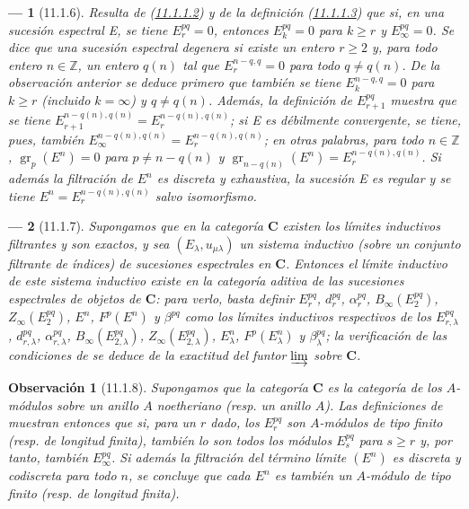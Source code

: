 \documentclass[10pt,oneside,openany]{book}
\theoremstyle{egaenv}\newtheorem*{env}{---}
\theoremstyle{egastatement}
\theoremstyle{egadescription}
\newtheorem*{remark}{Observación}
\renewcommand{\geq}{\geqslant}
\begin{document}
\begin{env}[11.1.6]
\label{0.11.1.6-fr}
Resulta de (\hyperref[0.11.1.1.2-fr]{11.1.1.2}) y de la definición (\hyperref[0.11.1.1.3-fr]{11.1.1.3}) que si, en una sucesión espectral E, se tiene
$E_r^{pq}=0$, entonces $E_k^{pq}=0$ para $k\geq r$ y $E_\infty^{pq}=0$.
Se dice que una sucesión espectral \emph{degenera} si existe un entero $r\geq2$ y, para todo entero $n\in\mathbb Z$, un entero $q(n)$ tal que \emph{$E_r^{n-q,q}=0$ para todo $q\ne q(n)$}.
De la observación anterior se deduce primero que también se tiene $E_k^{n-q,q}=0$ para $k\geq r$ (incluido $k=\infty$) y $q\ne q(n)$.
Además, la definición de $E_{r+1}^{pq}$ muestra que se tiene $E_{r+1}^{n-q(n),q(n)}=E_r^{n-q(n),q(n)}$; si E es \emph{débilmente convergente}, se tiene, pues, también
$E_\infty^{n-q(n),q(n)}=E_r^{n-q(n),q(n)}$; en otras palabras, para todo $n\in\mathbb Z$, $\operatorname{gr}_p(E^n)=0$ para $p\ne n-q(n)$ y $\operatorname{gr}_{n-q(n)}(E^n)=E_r^{n-q(n),q(n)}$.
Si además la filtración de $E^n$ es \emph{discreta} y \emph{exhaustiva}, la sucesión E es \emph{regular} y se tiene
$E^n=E_r^{n-q(n),q(n)}$ salvo isomorfismo.
\end{env}

\begin{env}[11.1.7]
\label{0.11.1.7}
\label{0.11.1.7-fr}
Supongamos que en la categoría $\boldsymbol{C}$ existen los límites inductivos filtrantes y son exactos, y sea $(E_\lambda,u_{\mu\lambda})$ un sistema inductivo (sobre un conjunto filtrante de índices) de sucesiones espectrales en $\boldsymbol{C}$.
Entonces el \emph{límite inductivo} de este sistema inductivo existe en la categoría aditiva de las sucesiones espectrales de objetos de $\boldsymbol{C}$: para verlo, basta definir $E_r^{pq}$, $d_r^{pq}$, $\alpha_r^{pq}$, $B_\infty(E_2^{pq})$, $Z_\infty(E_2^{pq})$, $E^n$, $F^p(E^n)$ y $\beta^{pq}$ como los límites inductivos respectivos de los $E_{r,\lambda}^{pq}$, $d_{r,\lambda}^{pq}$, $\alpha_{r,\lambda}^{pq}$, $B_\infty(E_{2,\lambda}^{pq})$, $Z_\infty(E_{2,\lambda}^{pq})$, $E_\lambda^n$, $F^p(E_\lambda^n)$ y $\beta_\lambda^{pq}$; la verificación de las condiciones de  se deduce de la exactitud del funtor $\varinjlim$ sobre $\boldsymbol{C}$.
\end{env}

\begin{remark}[11.1.8]
\label{0.11.1.8}
\label{0.11.1.8-fr}
Supongamos que la categoría $\boldsymbol{C}$ es la categoría de los $A$-módulos sobre un anillo $A$ \emph{noetheriano} (resp. un anillo $A$).
Las definiciones de  muestran entonces que si, para un $r$ dado, los $E_r^{pq}$ son $A$-módulos \emph{de tipo finito} (resp. \emph{de longitud finita}), también lo son todos los módulos $E_s^{pq}$ para $s\geq r$ y, por tanto, también $E_\infty^{pq}$.
Si además la filtración del término límite $(E^n)$ es \emph{discreta} y \emph{codiscreta} para todo $n$, se concluye que cada $E^n$ es también un $A$-módulo \emph{de tipo finito} (resp. \emph{de longitud finita}).
\end{remark}
\end{document}
